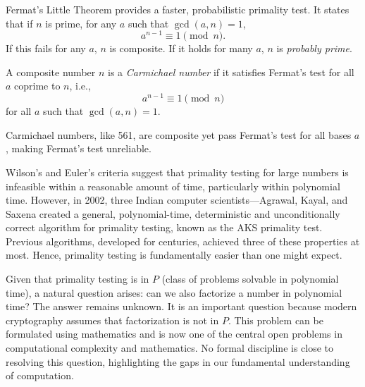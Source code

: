 Fermat's Little Theorem provides a faster, probabilistic primality test. It states that if \( n \) is prime, for any \( a \) such that \( \gcd(a, n) = 1 \),
\[
a^{n-1} \equiv 1 \pmod{n}.
\]
If this fails for any \( a \), \( n \) is composite. If it holds for many \( a \), \( n \) is \textit{probably prime}.

\begin{definition}
    A composite number \( n \) is a \textit{Carmichael number} if it satisfies Fermat's test for all \( a \) coprime to \( n \), i.e.,
    \[
    a^{n-1} \equiv 1 \pmod{n}
    \]
    for all \( a \) such that \( \gcd(a, n) = 1 \).
\end{definition}

Carmichael numbers, like 561, are composite yet pass Fermat's test for all bases \( a \), making Fermat's test unreliable.

Wilson's and Euler's criteria suggest that primality testing for large numbers is infeasible within a reasonable amount of time, particularly within polynomial time. However, in 2002, three Indian computer scientists—Agrawal, Kayal, and Saxena created a general, polynomial-time, deterministic and unconditionally correct algorithm for primality testing, known as the AKS primality test. Previous algorithms, developed for centuries, achieved three of these properties at most. Hence, primality testing is fundamentally easier than one might expect.

Given that primality testing is in $P$ (class of problems solvable in polynomial time), a natural question arises: can we also factorize a number in polynomial time? The answer remains unknown. It is an important question because modern cryptography assumes that factorization is not in $P$. This problem can be formulated using mathematics and is now one of the central open problems in computational complexity and mathematics.  No formal discipline is close to resolving this question, highlighting the gaps in our fundamental understanding of computation.